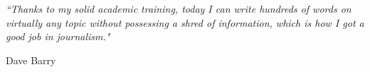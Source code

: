 
\pagestyle{empty} %

\null\vfill %

\textit{``Thanks to my solid academic training, today I can write hundreds of words on virtually any topic without possessing a shred of information, which is how I got a good job in journalism."}

\begin{flushright}
Dave Barry
\end{flushright}